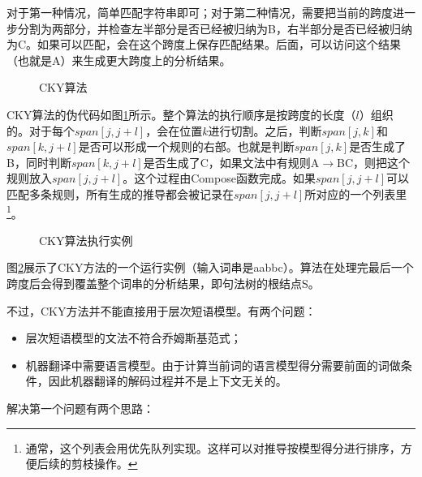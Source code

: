 \parinterval 对于第一种情况，简单匹配字符串即可；对于第二种情况，需要把当前的跨度进一步分割为两部分，并检查左半部分是否已经被归纳为B，右半部分是否已经被归纳为C。如果可以匹配，会在这个跨度上保存匹配结果。后面，可以访问这个结果（也就是A）来生成更大跨度上的分析结果。

\begin{figure}[htp]
\centering

\caption{CKY算法}
\label{fig:8-9}
\end{figure}

\parinterval CKY算法的伪代码如图\ref{fig:8-9}所示。整个算法的执行顺序是按跨度的长度（$l$）组织的。对于每个$span[j,j + l]$，会在位置$k$进行切割。之后，判断$span[j,k]$和$span[k,j +l]$是否可以形成一个规则的右部。也就是判断$span[j,k]$是否生成了B，同时判断$span[k,j + l]$是否生成了C，如果文法中有规则A$\to$BC，则把这个规则放入$span[j,j+l]$。这个过程由Compose函数完成。如果$span[j,j + l]$可以匹配多条规则，所有生成的推导都会被记录在$span[j,j + l]$所对应的一个列表里\footnote[6]{通常，这个列表会用优先队列实现。这样可以对推导按模型得分进行排序，方便后续的剪枝操作。}。

\begin{figure}[t]
\centering


\caption{CKY算法执行实例}
\label{fig:8-10}
\end{figure}

\parinterval 图\ref{fig:8-10}展示了CKY方法的一个运行实例（输入词串是aabbc）。算法在处理完最后一个跨度后会得到覆盖整个词串的分析结果，即句法树的根结点S。

\parinterval 不过，CKY方法并不能直接用于层次短语模型。有两个问题：

\begin{itemize}
\vspace{0.5em}
\item 层次短语模型的文法不符合乔姆斯基范式；
\vspace{0.5em}
\item 机器翻译中需要语言模型。由于计算当前词的语言模型得分需要前面的词做条件，因此机器翻译的解码过程并不是上下文无关的。
\vspace{0.5em}
\end{itemize}

\parinterval 解决第一个问题有两个思路：

